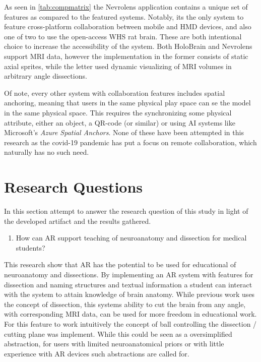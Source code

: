 As seen in \autoref{tab:compmatrix} the Nevrolens application contains a unique set of features as compared to the featured systems. Notably, its the only system to feature cross-platform collaboration between mobile and HMD devices, and also one of two to use the open-access WHS rat brain. These are both intentional choice to increase the accessibility of the system.
Both HoloBrain and Nevrolens support MRI data, however the implementation in the former consists of static axial sprites, while the letter used dynamic visualizing of MRI volumes in arbitrary angle dissections.

Of note, every other system with collaboration features includes spatial anchoring, meaning that users in the same physical play space can se the model in the same physical space. This requires the synchronizing some physical attribute, either an object, a QR-code (or similar) or using AI systems like Microsoft's \textit{Azure Spatial Anchors}. None of these have been attempted in this research as the covid-19 pandemic has put a focus on remote collaboration, which naturally has no such need.

\section{Research Questions}
In this section attempt to answer the research question of this study in light of the developed artifact and the results gathered.

\begin{enumerate}[label=\textbf{RQ1:}, left=\parindent]
    \itshape
    \item How can AR support teaching of neuroanatomy and dissection for medical students?
\end{enumerate}

This research show that AR has the potential to be used for educational of neuroanatomy and dissections. By implementing an AR system with features for dissection and naming structures and textual information a student can interact with the system to attain knowledge of brain anatomy. While previous work uses the concept of dissection, this systems ability to cut the brain from any angle, with corresponding MRI data, can be used for more freedom in educational work. For this feature to work intuitively the concept of ball controlling the dissection / cutting plane was implement. While this could be seen as a oversimplified abstraction, for users with limited neuroanatomical priors or with little experience with AR devices such abstractions are called for. 


